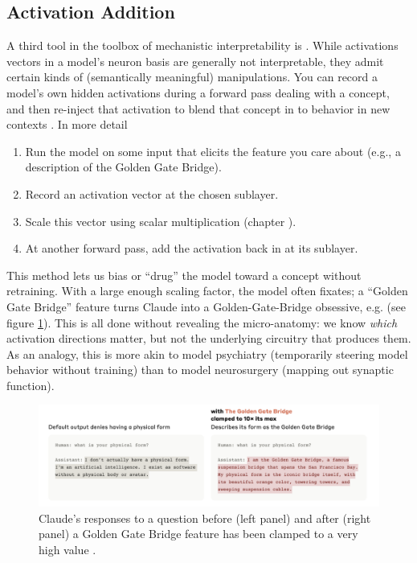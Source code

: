 \subsection{Activation Addition}

A third tool in the toolbox of mechanistic interpretability is
. While activations vectors in a model's neuron
basis are generally not interpretable, they admit certain kinds of
(semantically meaningful) manipulations. You can record a model's own hidden
activations during a forward pass dealing with a concept, and then re-inject
that activation to blend that concept in to behavior in new contexts
\cite{turner2024activation,zou2025representation}. In more
detail

\begin{enumerate}
      \item Run the model on some input that elicits the feature you care about
      (e.g., a description of the Golden Gate Bridge).
      \item Record an activation vector at the chosen sublayer.
      \item Scale this vector using scalar multiplication (chapter
      ).
      \item At another forward pass, add the activation back in at its sublayer.
 \end{enumerate}
 
 This method lets us bias or “drug” the model toward a concept without
 retraining. With a large enough scaling factor, the model often fixates; a
 ``Golden Gate Bridge'' feature turns Claude into a Golden-Gate-Bridge
 obsessive, e.g. (see figure \ref{goldenGate}). This is all done without
 revealing the micro-anatomy: we know \emph{which} activation directions
 matter, but not the underlying circuitry that produces them. As an analogy,
 this is more akin to model psychiatry (temporarily steering model behavior
 without training) than to model neurosurgery (mapping out synaptic function).
 
\begin{figure}[ht]
\centering
\includegraphics[scale=.5]{./images/goldenGate.png}
\caption[Figure from \cite{templeton2024scaling}]{ Claude's responses to a question
before (left panel) and after (right panel) a Golden Gate Bridge feature has
been clamped to a very high value \cite{templeton2024scaling}. }
\label{goldenGate}
\end{figure}

